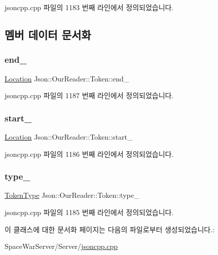 jsoncpp.\+cpp 파일의 1183 번째 라인에서 정의되었습니다.



\subsection{멤버 데이터 문서화}
\mbox{\label{class_json_1_1_our_reader_1_1_token_a67d2071638add857528579ae3791eccc}} 
\subsubsection{\texorpdfstring{end\+\_\+}{end\_}}
{\footnotesize\ttfamily \hyperlink{class_json_1_1_our_reader_a1bdc7bbc52ba87cae6b19746f2ee0189}{Location} Json\+::\+Our\+Reader\+::\+Token\+::end\+\_\+}



jsoncpp.\+cpp 파일의 1187 번째 라인에서 정의되었습니다.

\mbox{\label{class_json_1_1_our_reader_1_1_token_aedf68bb00eaaa9d3c22b9825999602ac}} 
\subsubsection{\texorpdfstring{start\+\_\+}{start\_}}
{\footnotesize\ttfamily \hyperlink{class_json_1_1_our_reader_a1bdc7bbc52ba87cae6b19746f2ee0189}{Location} Json\+::\+Our\+Reader\+::\+Token\+::start\+\_\+}



jsoncpp.\+cpp 파일의 1186 번째 라인에서 정의되었습니다.

\mbox{\label{class_json_1_1_our_reader_1_1_token_abe7d858530396fa7e1293f7a579880ed}} 
\subsubsection{\texorpdfstring{type\+\_\+}{type\_}}
{\footnotesize\ttfamily \hyperlink{class_json_1_1_our_reader_a15116f7276ddf1e7a2cc3cbefa884dcc}{Token\+Type} Json\+::\+Our\+Reader\+::\+Token\+::type\+\_\+}



jsoncpp.\+cpp 파일의 1185 번째 라인에서 정의되었습니다.



이 클래스에 대한 문서화 페이지는 다음의 파일로부터 생성되었습니다.\+:\begin{DoxyCompactItemize}
\item 
Space\+War\+Server/\+Server/\hyperlink{jsoncpp_8cpp}{jsoncpp.\+cpp}\end{DoxyCompactItemize}
